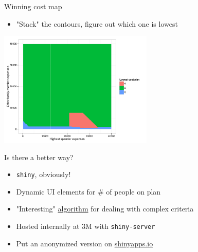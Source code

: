 \documentclass[sans,aspectratio=169,presentation,bigger,fleqn]{beamer}
\begin{document}
\begin{frame}[label=sec-21]{Winning cost map}
\begin{itemize}
\item "Stack" the contours, figure out which one is lowest
\end{itemize}

\begin{center}
\includegraphics[height=5.5cm]{./img/ins-cost-map.pdf}
\end{center}
\end{frame}

\begin{frame}[fragile,label=sec-22]{Is there a better way?}
 \begin{itemize}
\item \texttt{shiny}, obviously!
\item Dynamic UI elements for \# of people on plan
\item "Interesting" \href{http://stackoverflow.com/questions/18116967/dealing-with-conditionals-in-a-better-manner-than-deeply-nested-ifelse-blocks}{algorithm} for dealing with complex criteria
\item Hosted internally at 3M  with \texttt{shiny-server}
\item Put an anonymized version on \href{https://www.shinyapps.io/}{shinyapps.io}
\end{itemize}
\end{frame}
\end{document}

